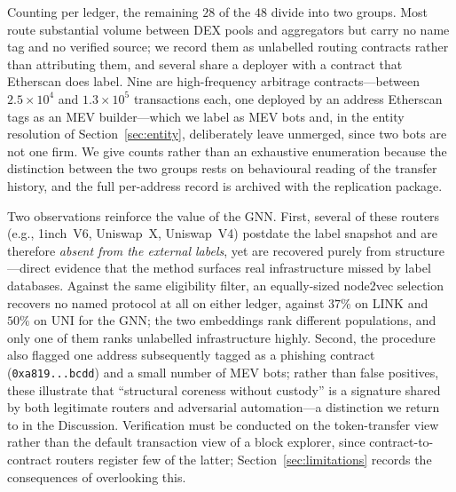 \documentclass[final,5p,times]{elsarticle}
\begin{document}
Counting per ledger, the remaining $28$ of the $48$ divide into two groups. Most route
substantial volume between DEX pools and aggregators but carry no name tag
and no verified source; we record them as unlabelled routing contracts
rather than attributing them, and several share a deployer with a contract
that Etherscan does label. Nine are high-frequency arbitrage
contracts---between $2.5\times10^4$ and $1.3\times10^5$ transactions each,
one deployed by an address Etherscan tags as an MEV builder---which we
label as MEV bots and, in the entity resolution of
Section~\ref{sec:entity}, deliberately leave unmerged, since two bots are
not one firm. We give counts rather than an exhaustive enumeration because
the distinction between the two groups rests on behavioural reading of the
transfer history, and the full per-address record is archived with the
replication package.

Two observations reinforce the value of the GNN. First, several of these
routers (e.g., 1inch~V6, Uniswap~X, Uniswap~V4) postdate the label snapshot
and are therefore \emph{absent from the external labels}, yet are recovered
purely from structure---direct evidence that the method surfaces real
infrastructure missed by label databases. Against the same eligibility
filter, an equally-sized node2vec selection recovers no named protocol at
all on either ledger, against $37\%$ on LINK and $50\%$ on UNI for the GNN; the two
embeddings rank different populations, and only one of them ranks unlabelled
infrastructure highly. Second, the procedure also
flagged one address subsequently tagged as a phishing contract
(\texttt{0xa819...bcdd}) and a small number of MEV bots; rather than
false positives, these illustrate that ``structural coreness without
custody'' is a signature shared by both legitimate routers and adversarial
automation---a distinction we return to in the Discussion. Verification must be conducted on the
token-transfer view rather than the default transaction view of a block
explorer, since contract-to-contract routers register few of the latter;
Section~\ref{sec:limitations} records the consequences of overlooking this.
\end{document}
